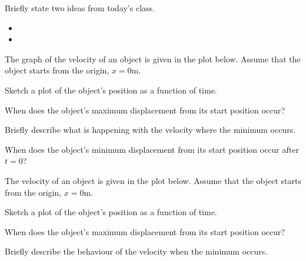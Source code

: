 \begin{problem}
\item Briefly state two ideas from today's class.
  \begin{itemize}
  \item
  \item
  \end{itemize}
\item The graph of the velocity of an object is given in the plot
  below. Assume that the object starts from the origin, $x=0$m. \\
  \scalebox{0.7}{}
  \begin{subproblem}
  \item Sketch a plot of the object's position as a function of time.
  \item When does the object's maximum displacement from its start
    position occur?
    \vspace{3em}
  \item Briefly describe what is happening with the velocity where the
    minimum occurs.
    \vfill
  \item When does the object's minimum displacement from its start
    position occur after $t=0$?
    \vspace{3em}
  \end{subproblem}

  \clearpage

\item The velocity of an object is given in the plot below. Assume
  that the object starts from the origin, $x=0$m.

  \scalebox{0.7}{}

  \begin{subproblem}
  \item Sketch a plot of the object's position as a function of time.
  \item When does the object's maximum displacement from its start
    position occur?
    \vspace{3em}
  \item Briefly describe the behaviour of the velocity when the
    minimum occurs.
    \vfill
  \end{subproblem}

\clearpage


\end{problem}
